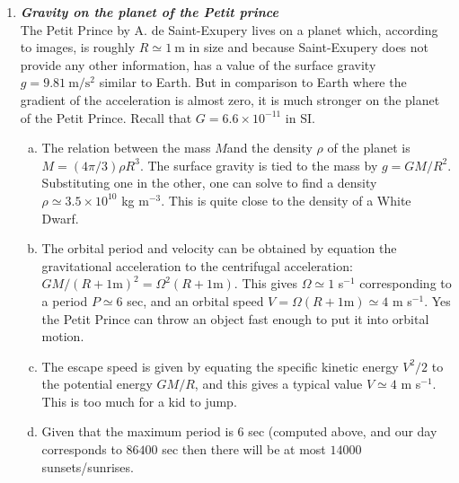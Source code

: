 \documentclass[a4paper,12pt]{article}
\newcommand{\question}[1]{\textbf{\textit{#1}}}
\begin{document}
\begin{enumerate}

\item \question{Gravity on the planet of the Petit prince}\\
The Petit Prince by A. de Saint-Exupery lives on a planet which,
according to images, is roughly $R\simeq 1~\mathrm{m}$ in size and
because Saint-Exupery does not provide any other information, has a
value of the surface gravity $g=9.81~\mathrm{m}/\mathrm{s}^2$ similar
to Earth. But in comparison to Earth where the gradient of the
acceleration is almost zero, it is much stronger on the planet of the
Petit Prince. Recall that $G=6.6\times 10^{-11}$ in SI.
\begin{enumerate}[(a)]
\item{The relation between the mass $M$and the density $\rho$ of the planet is
    $M=(4\pi /3)\rho R^3$. The surface gravity is tied to the mass by
    $g=GM/R^2$. Substituting one in the other, one can solve to find a
    density $\rho \simeq 3.5\times 10^{10}$ kg m$^{-3}$. This is quite
  close to the density of a White Dwarf.}
\item{The orbital period and velocity can be obtained by equation the
    gravitational acceleration to the centrifugal acceleration:
    $GM/(R+1\mathrm{m})^2 = \Omega^2 (R+1\mathrm{m}) $. This gives
    $\Omega \simeq 1$ s$^{-1}$ corresponding to a period $P\simeq 6$ sec, and
    an orbital speed $V=\Omega (R+1\mathrm{m})\simeq 4$ m
    s$^{-1}$. Yes the Petit Prince can throw an object fast enough to
    put it into orbital motion.}
\item{The escape speed is given by equating the specific kinetic
    energy $V^2/2$ to the potential energy $GM/R$, and this gives a
    typical value $V\simeq 4$ m
    s$^{-1}$. This is too much for a kid to jump.}
\item{Given that the maximum period is 6 sec (computed above, and our
    day corresponds to $86400$ sec then
    there will be at most $14000$ sunsets/sunrises.}
\end{enumerate}


\end{enumerate}
\end{document}
